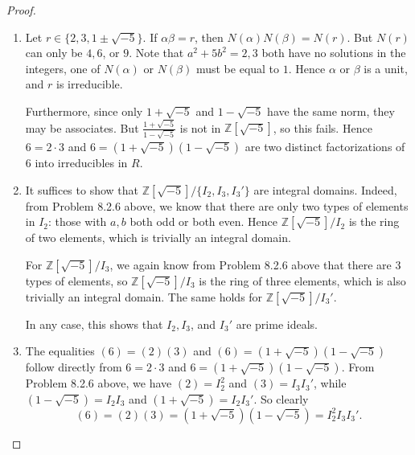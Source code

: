 \documentclass[12pt]{article}
\theoremstyle{remark}
\theoremstyle{named}
\renewcommand{\a}{\alpha}
\renewcommand{\b}{\beta}
\newcommand{\Z}{\mathbb Z}
\begin{document}
\begin{proof}
    \hspace*{0in}
    \begin{enumerate}
        \item Let \(r \in \{2, 3, 1 \pm \sqrt{-5}\}\). If \(\a \b = r\), then \(N(\a) N(\b) = N(r)\). But \(N(r)\) can only be \(4, 6\), or \(9\). Note that \(a^2 + 5b^2 = 2, 3\) both have no solutions in the integers, one of \(N(\a)\) or \(N(\b)\) must be equal to \(1\). Hence \(\a\) or \(\b\) is a unit, and \(r\) is irreducible. 
        
        Furthermore, since only \(1 + \sqrt{-5}\) and \(1 - \sqrt{-5}\) have the same norm, they may be associates. But \(\frac{1 + \sqrt{-5}}{1 - \sqrt{-5}}\) is not in \(\Z[\sqrt{-5}]\), so this fails. Hence \(6 = 2 \cdot 3\) and \(6 = (1 + \sqrt{-5})(1 - \sqrt{-5})\) are two distinct factorizations of \(6\) into irreducibles in \(R\).
        \item It suffices to show that \(\Z[\sqrt{-5}] / \{I_2, I_3, I_3'\}\) are integral  domains. Indeed, from Problem 8.2.6 above, we know that there are only two types of elements in \(I_2\): those with \(a, b\) both odd or both even. Hence \(\Z[\sqrt{-5}] / I_2\) is the ring of two elements, which is trivially an integral domain.
        
        For \(\Z[\sqrt{-5}] / I_3\), we again know from Problem 8.2.6 above that there are 3 types of elements, so \(\Z[\sqrt{-5}] / I_3\) is the ring of three elements, which is also trivially an integral domain. The same holds for \(\Z[\sqrt{-5}] / I_3'\).

        In any case, this shows that \(I_2, I_3\), and \(I_3'\) are prime ideals.
        \item The equalities \((6) = (2)(3)\) and \((6) = (1 + \sqrt{-5})(1 - \sqrt{-5})\) follow directly from \(6 = 2 \cdot 3\) and \(6 = (1 + \sqrt{-5})(1 - \sqrt{-5})\). From Problem 8.2.6 above, we have \((2) = I_2^2\) and \((3) = I_3 I_3'\), while \((1 - \sqrt{-5}) = I_2 I_3\) and \((1 + \sqrt{-5}) = I_2 I_3'\). So clearly \[(6) = (2)(3) = (1 + \sqrt{-5})(1 - \sqrt{-5}) = I_2^2 I_3 I_3'.\]
    \end{enumerate}
\end{proof}
\end{document}

